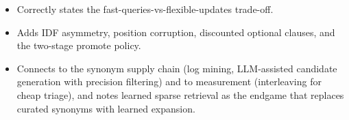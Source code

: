 \begin{interviewq}

\goodgreat
\begin{itemize}
    \item {} Correctly states the fast-queries-vs-flexible-updates trade-off.
    \item {} Adds IDF asymmetry, position corruption, discounted optional clauses, and the two-stage promote policy.
    \item {} Connects to the synonym supply chain (log mining, LLM-assisted candidate generation with precision filtering) and to measurement (interleaving for cheap triage), and notes learned sparse retrieval as the endgame that replaces curated synonyms with learned expansion.
\end{itemize}

\end{interviewq}

